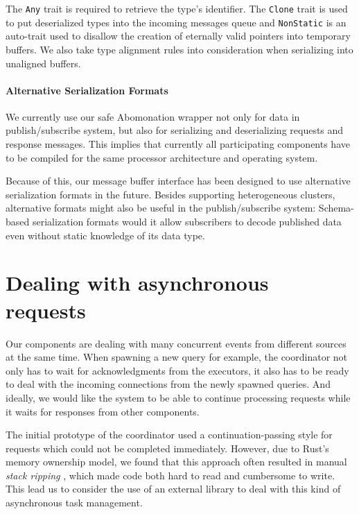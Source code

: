 The \lstinline{Any} trait is required to retrieve the type's identifier. The
\lstinline{Clone} trait is used to put deserialized types into the incoming
messages queue and \lstinline{NonStatic} is an auto-trait used to disallow the
creation of eternally valid pointers into temporary buffers. We also take type
alignment rules into consideration when serializing into unaligned buffers. 

\paragraph{Alternative Serialization Formats}

We currently use our safe Abomonation wrapper not only for data in
publish/subscribe system, but also for serializing and deserializing requests
and response messages. This implies that currently all participating components
have to be compiled for the same processor architecture and operating system.

Because of this, our message buffer interface has been designed to use alternative
serialization formats in the future. Besides supporting heterogeneous clusters,
alternative formats might also be useful in the publish/subscribe system:
Schema-based serialization formats would it allow subscribers to decode published
data even without static knowledge of its data type.

\section{Dealing with asynchronous requests} \label{sec:futures}

Our components are dealing with many concurrent events from different sources
at the same time. When spawning a new query for example, the coordinator not
only has to wait for acknowledgments from the executors, it also has to be
ready to deal with the incoming connections from the newly spawned queries. And
ideally, we would like the system to be able to continue processing requests
while it waits for responses from other components.

The initial prototype of the coordinator used a continuation-passing style
for requests which could not be completed immediately. However, due to
Rust's memory ownership model, we found that this approach often resulted
in manual \emph{stack ripping} \cite{stackmgmt}, which made code both
hard to read and cumbersome to write. This lead us to consider the use of an
external library to deal with this kind of asynchronous task management.

